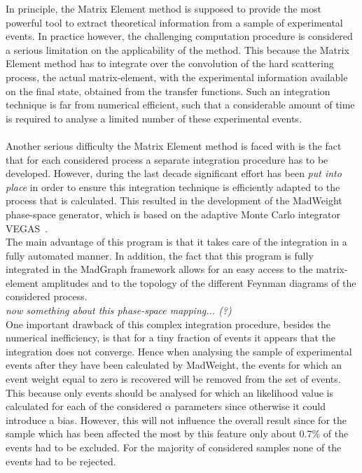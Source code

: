 In principle, the Matrix Element method is supposed to provide the most powerful tool to extract theoretical information from a sample of experimental events.
In practice however, the challenging computation procedure is considered a serious limitation on the applicability of the method.
This because the Matrix Element method has to integrate over the convolution of the hard scattering process, the actual matrix-element, with the experimental information available on the final state, obtained from the transfer functions.
Such an integration technique is far from numerical efficient, such that a considerable amount of time is required to analyse a limited number of these experimental events.
\\
\\
Another serious difficulty the Matrix Element method is faced with is the fact that for each considered process a separate integration procedure has to be developed.
However, during the last decade significant effort has been \textit{put into place} in order to ensure this integration technique is efficiently adapted to the process that is calculated.
This resulted in the development of the MadWeight phase-space generator, which is based on the adaptive Monte Carlo integrator VEGAS~\cite{VEGAS}.
\\
The main advantage of this program is that it takes care of the integration in a fully automated manner.
In addition, the fact that this program is fully integrated in the MadGraph framework allows for an easy access to the matrix-element amplitudes and to the topology of the different Feynman diagrams of the considered process.
\\
\textit{now something about this phase-space mapping... (?)}
\\

One important drawback of this complex integration procedure, besides the numerical inefficiency, is that for a tiny fraction of events it appears that the integration does not converge.
Hence when analysing the sample of experimental events after they have been calculated by MadWeight, the events for which an event weight equal to zero is recovered will be removed from the set of events.
This because only events should be analysed for which an likelihood value is calculated for each of the considered $\alpha$ parameters since otherwise it could introduce a bias.
However, this will not influence the overall result since for the sample which has been affected the most by this feature only about $0.7\%$ of the events had to be excluded. For the majority of considered samples none of the events had to be rejected.
\\

